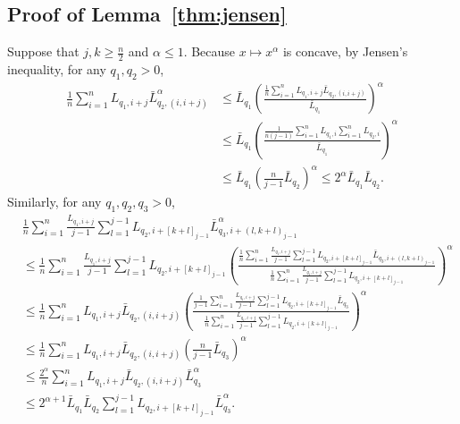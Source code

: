 \documentclass[aos]{imsart}
\begin{document}
\begin{appendix}
\subsection{Proof of Lemma~\ref{thm:jensen}}

Suppose that $j, k \geq \frac{n}{2}$ and $\alpha \leq 1$. Because $x \mapsto x^\alpha$ is concave, by Jensen's inequality, for any $q_1, q_2 > 0$,
\begin{equation*}   
\begin{aligned}
    \frac{1}{n} \sum_{i=1}^{n} L_{q_1,i+j} \bar{L}_{q_2,(i,i+j)}^\alpha
    & \leq \bar{L}_{q_1} \left( 
        \frac{\frac{1}{n} \sum_{i=1}^{n} L_{q_1,i+j} \bar{L}_{q_2,(i,i+j)}}{\bar{L}_{q_1}} 
    \right)^\alpha \\
    & \leq \bar{L}_{q_1} \left( 
        \frac{\frac{1}{n (j-1)} \sum_{i=1}^{n} L_{q_1,i} \sum_{i=1}^n L_{q_2,i}}{\bar{L}_{q_1}} 
    \right)^\alpha\\ 
    & \leq \bar{L}_{q_1} \left(
        \frac{n}{j-1} \bar{L}_{q_2}
    \right)^\alpha 
    \leq 2^\alpha \bar{L}_{q_1} \bar{L}_{q_2}.
\end{aligned}
\end{equation*}
Similarly, for any $q_1, q_2, q_3 > 0$,
\begin{equation*}
\begin{aligned}
    & \frac{1}{n} \sum_{i=1}^{n} \frac{L_{q_1,i+j}}{j-1} 
    \sum_{l=1}^{j-1} L_{q_2,i+[k+l]_{j-1}} \bar{L}_{q_3, i+(l,k+l)_{j-1}}^\alpha \\
    & \leq \frac{1}{n} \sum_{i=1}^{n} \frac{L_{q_1,i+j}}{j-1} \sum_{l=1}^{j-1} L_{q_2,i+[k+l]_{j-1}} \left(
        \frac{\frac{1}{n} \sum_{i=1}^{n} \frac{L_{q_1,i+j}}{j-1} 
        \sum_{l=1}^{j-1} L_{q_2,i+[k+l]_{j-1}} \bar{L}_{q_3, i+(l,k+l)_{j-1}}} 
        {\frac{1}{n} \sum_{i=1}^{n} \frac{L_{q_1,i+j}}{j-1} \sum_{l=1}^{j-1} L_{q_2,i+[k+l]_{j-1}}}
    \right)^\alpha \\
    & \leq \frac{1}{n} \sum_{i=1}^{n} L_{q_1,i+j} \bar{L}_{q_2,(i,i+j)} \left(
        \frac{\frac{1}{j-1} \sum_{i=1}^{n} \frac{L_{q_1,i+j}}{j-1} 
        \sum_{l=1}^{j-1} L_{q_2,i+[k+l]_{j-1}} \bar{L}_{q_3}} 
        {\frac{1}{n} \sum_{i=1}^{n} \frac{L_{q_1,i+j}}{j-1} \sum_{l=1}^{j-1} L_{q_2,i+[k+l]_{j-1}}}
    \right)^\alpha \\
    & \leq \frac{1}{n} \sum_{i=1}^{n} L_{q_1,i+j} \bar{L}_{q_2,(i,i+j)} \left(
        \frac{n}{j-1} \bar{L}_{q_3}
    \right)^\alpha \\
    & \leq \frac{2^\alpha}{n} \sum_{i=1}^{n} L_{q_1,i+j} \bar{L}_{q_2,(i,i+j)} \bar{L}_{q_3}^\alpha \\
    & \leq 2^{\alpha+1} \bar{L}_{q_1} \bar{L}_{q_2} \sum_{l=1}^{j-1} L_{q_2,i+[k+l]_{j-1}} \bar{L}_{q_3}^\alpha. \\
\end{aligned}
\end{equation*}




\end{appendix}
\end{document}
